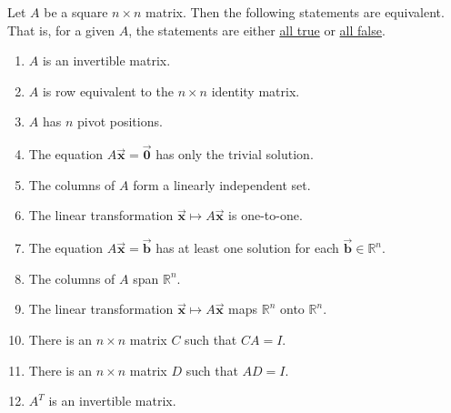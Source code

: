 \documentclass[letter,11pt]{article}
\begin{document}
\newpage
\begin{tcolorbox}[colback=red!5!white,
colframe=red!75!black,boxrule=1mm, width=(.9\linewidth),before=\hfill,after=\hfill,fonttitle=\bfseries,,adjusted title={Invertible Matrix Theorem}]
    Let $A$ be a square $n\times n$ matrix. Then the following statements are equivalent. That is, for a given $A$, the statements are either \underline{all true} or \underline{all false}.
    \tcblower
    \begin{enumerate}[label = \alph*.]
        \item $A$ is an invertible matrix.
        \item $A$ is row equivalent to the $n\times n$ identity matrix.
        \item $A$ has $n$ pivot positions.
        \item The equation $A \vec{\mathrm{\boldsymbol{x}}}=\vec{\boldsymbol{0}}$ has only the trivial solution.
        \item The columns of $A$ form a linearly independent set.
        \item The linear transformation $\vec{\mathrm{\boldsymbol{x}}} \mapsto A\vec{\mathrm{\boldsymbol{x}}}$ is one-to-one.
        \item The equation $A \vec{\mathrm{\boldsymbol{x}}}=\vec{\boldsymbol{b}}$ has at least one solution for each $\vec{\boldsymbol{b}} \in \mathbb{R}^{n}$.
        \item The columns of $A$ span $\mathbb{R}^{n}$.
        \item The linear transformation $\vec{\mathrm{\boldsymbol{x}}} \mapsto A\vec{\mathrm{\boldsymbol{x}}}$ maps $\mathbb{R}^{n}$ onto $\mathbb{R}^{n}$.
        \item There is an $n\times n$ matrix $C$ such that $CA=I$.
        \item There is an $n\times n$ matrix $D$ such that $AD=I$.
        \item $A^{T}$ is an invertible matrix.
    \end{enumerate}
\end{tcolorbox}
\end{document}
